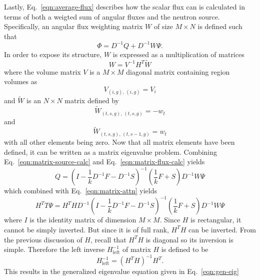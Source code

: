 Lastly, Eq.~\ref{eqn:average-flux} describes how the scalar flux can is calculated in terms of both a weigted sum of angular fluxes and the neutron source. Specifically, an angular flux weighting matrix $W$ of size $M \times N$ is defined such that
\begin{equation}
\Phi = D^{-1}Q + D^{-1} W \Psi.
\label{eqn:matrix-flux-calc}
\end{equation}
In order to expose its structure, $W$ is expressed as a multiplication of matrices
\begin{equation}
W = V^{-1} H^T \tilde{W}
\end{equation}
where the volume matrix $V$ is a $M \times M$ diagonal matrix containing region volumes as
\begin{equation}
V_{\left(i, g\right), \, \left(i, g\right)} = V_i
\end{equation}
and $\tilde{W}$ is an $N \times N$ matrix defined by
\begin{equation}
\tilde{W}_{\left(t,s,g\right), \, \left(t, s, g\right)} = -w_{t}
\end{equation}
and
\begin{equation}
\tilde{W}_{\left(t,s,g\right), \, \left(t, s-1, g\right)} = w_{t}
\end{equation}
with all other elements being zero. Now that all matrix elements have been defined, it can be written as a matrix eigenvalue problem. Combining Eq.~\ref{eqn:matrix-source-calc} and Eq.~\ref{eqn:matrix-flux-calc} yields
\begin{equation}
Q = \left(I - \frac{1}{k} D^{-1} F - D^{-1} S \right)^{-1} \left(\frac{1}{k} F + S \right) D^{-1} W \Psi
\end{equation}
which combined with Eq.~\ref{eqn:matrix-attn} yields
\begin{equation}
H^T T \Psi = H^T H D^{-1} \left(I - \frac{1}{k} D^{-1} F - D^{-1} S \right)^{-1} \left(\frac{1}{k} F + S \right) D^{-1} W \Psi
\end{equation}
where $I$ is the identity matrix of dimension $M \times M$. Since $H$ is rectangular, it cannot be simply inverted. But since it is of full rank, $H^T H$ can be inverted. From the previous discussion of $H$, recall that $H^T H$ is diagonal so its inversion is simple. Therefore the left inverse $H_{\text{left}}^{-1}$ of matrix $H$ is defined to be
\begin{equation}
H_{\text{left}}^{-1} = \left(H^T H\right)^{-1} H^T.
\end{equation}
This results in the generalized eigenvalue equation given in Eq.~\ref{eqn:gen-eig}
